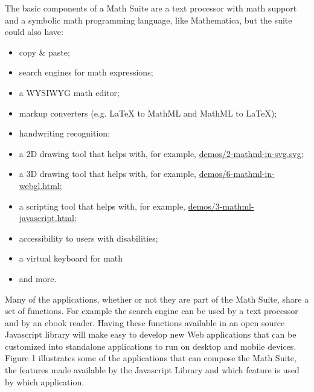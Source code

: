 The basic components of a Math
Suite are a text processor with math support and a symbolic math programming
language, like Mathematica, but the suite could also have:
\begin{itemize}
  \item copy \& paste;
  \item search engines for math expressions;
  \item a WYSIWYG math editor;
  \item markup converters (e.g. LaTeX to MathML and MathML to LaTeX);
  \item handwriting recognition;
  \item a 2D drawing tool that helps with, for example,
    \href{http://fred-wang.github.io/MathUI2014/demos/2-mathml-in-svg.svg}{demos/2-mathml-in-svg.svg};
  \item a 3D drawing tool that helps with, for example,
    \href{http://fred-wang.github.io/MathUI2014/demos/6-mathml-in-webgl.html}{demos/6-mathml-in-webgl.html};
  \item a scripting tool that helps with, for example,
    \href{http://fred-wang.github.io/MathUI2014/demos/3-mathml-javascript.html}{demos/3-mathml-javascript.html};
  \item accessibility to users with disabilities;
  \item a virtual keyboard for math
  \item and more.
\end{itemize}

Many of the applications, whether or not they are part of the Math Suite,
share a set of functions. For
example the search engine can be used by a text processor and by an ebook
reader. Having
these functions available in an open source Javascript library will make easy to
develop new Web applications that can be customized into standalone applications
to run on desktop and mobile devices. Figure 1 illustrates some of the
applications that can compose the Math Suite, the features made available by the
Javascript Library and which feature is used by which application.

